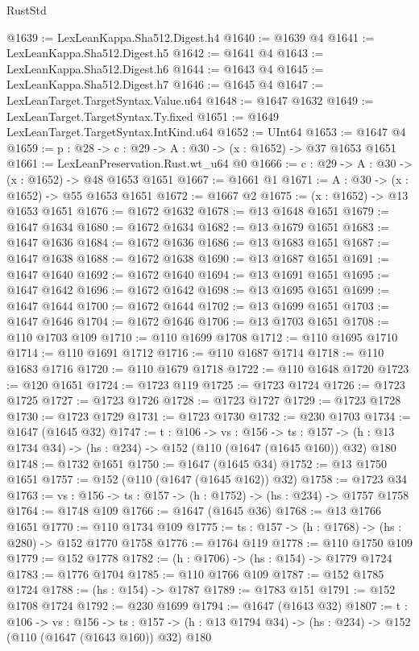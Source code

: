 \begin{lexlean}{RustStd}
\begin{coremodule}
@1639 := LexLeanKappa.Sha512.Digest.h4
@1640 := @1639 @4
@1641 := LexLeanKappa.Sha512.Digest.h5
@1642 := @1641 @4
@1643 := LexLeanKappa.Sha512.Digest.h6
@1644 := @1643 @4
@1645 := LexLeanKappa.Sha512.Digest.h7
@1646 := @1645 @4
@1647 := LexLeanTarget.TargetSyntax.Value.u64
@1648 := @1647 @1632
@1649 := LexLeanTarget.TargetSyntax.Ty.fixed
@1651 := @1649 LexLeanTarget.TargetSyntax.IntKind.u64
@1652 := UInt64
@1653 := @1647 @4
@1659 := {p : @28} -> {c : @29} -> {A : @30} -> (x : @1652) -> @37 @1653 @1651
@1661 := LexLeanPreservation.Rust.wt_u64 @0
@1666 := {c : @29} -> {A : @30} -> (x : @1652) -> @48 @1653 @1651
@1667 := @1661 @1
@1671 := {A : @30} -> (x : @1652) -> @55 @1653 @1651
@1672 := @1667 @2
@1675 := (x : @1652) -> @13 @1653 @1651
@1676 := @1672 @1632
@1678 := @13 @1648 @1651
@1679 := @1647 @1634
@1680 := @1672 @1634
@1682 := @13 @1679 @1651
@1683 := @1647 @1636
@1684 := @1672 @1636
@1686 := @13 @1683 @1651
@1687 := @1647 @1638
@1688 := @1672 @1638
@1690 := @13 @1687 @1651
@1691 := @1647 @1640
@1692 := @1672 @1640
@1694 := @13 @1691 @1651
@1695 := @1647 @1642
@1696 := @1672 @1642
@1698 := @13 @1695 @1651
@1699 := @1647 @1644
@1700 := @1672 @1644
@1702 := @13 @1699 @1651
@1703 := @1647 @1646
@1704 := @1672 @1646
@1706 := @13 @1703 @1651
@1708 := @110 @1703 @109
@1710 := @110 @1699 @1708
@1712 := @110 @1695 @1710
@1714 := @110 @1691 @1712
@1716 := @110 @1687 @1714
@1718 := @110 @1683 @1716
@1720 := @110 @1679 @1718
@1722 := @110 @1648 @1720
@1723 := @120 @1651
@1724 := @1723 @119
@1725 := @1723 @1724
@1726 := @1723 @1725
@1727 := @1723 @1726
@1728 := @1723 @1727
@1729 := @1723 @1728
@1730 := @1723 @1729
@1731 := @1723 @1730
@1732 := @230 @1703
@1734 := @1647 (@1645 @32)
@1747 := {t : @106} ->
  {vs : @156} ->
  {ts : @157} -> (h : @13 @1734 @34) -> (hs : @234) -> @152 (@110 (@1647 (@1645 @160)) @32) @180
@1748 := @1732 @1651
@1750 := @1647 (@1645 @34)
@1752 := @13 @1750 @1651
@1757 := @152 (@110 (@1647 (@1645 @162)) @32)
@1758 := @1723 @34
@1763 := {vs : @156} -> {ts : @157} -> (h : @1752) -> (hs : @234) -> @1757 @1758
@1764 := @1748 @109
@1766 := @1647 (@1645 @36)
@1768 := @13 @1766 @1651
@1770 := @110 @1734 @109
@1775 := {ts : @157} -> (h : @1768) -> (hs : @280) -> @152 @1770 @1758
@1776 := @1764 @119
@1778 := @110 @1750 @109
@1779 := @152 @1778
@1782 := (h : @1706) -> (hs : @154) -> @1779 @1724
@1783 := @1776 @1704
@1785 := @110 @1766 @109
@1787 := @152 @1785 @1724
@1788 := (hs : @154) -> @1787
@1789 := @1783 @151
@1791 := @152 @1708 @1724
@1792 := @230 @1699
@1794 := @1647 (@1643 @32)
@1807 := {t : @106} ->
  {vs : @156} ->
  {ts : @157} -> (h : @13 @1794 @34) -> (hs : @234) -> @152 (@110 (@1647 (@1643 @160)) @32) @180

\end{coremodule}
\end{lexlean}
